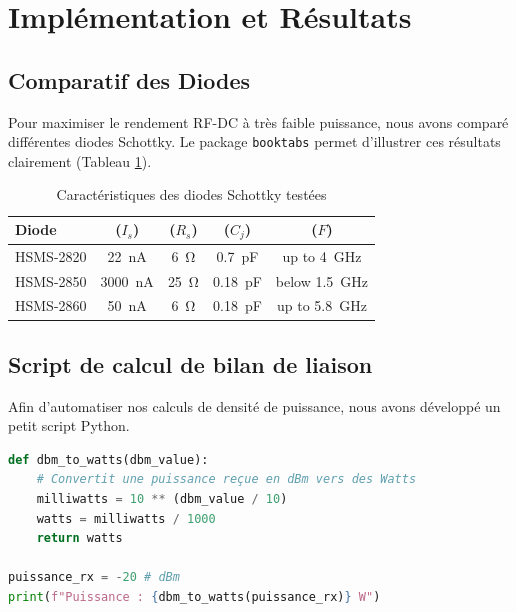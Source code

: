 \section{Implémentation et Résultats}
\label{sec:}

\subsection{Comparatif des Diodes}
Pour maximiser le rendement RF-DC à très faible puissance, nous avons comparé différentes diodes Schottky. Le package \texttt{booktabs} permet d'illustrer ces résultats clairement (Tableau \ref{tab:diodes}).

\begin{table}[h]
    \centering
    \caption{Caractéristiques des diodes Schottky testées}
    \label{tab:diodes}
    \begin{tabular}{lcccc}
        \toprule
        \textbf{Diode} & \textbf{($I_s$)} & \textbf{($R_s$)} & \textbf{($C_j$)} & \textbf{($F$)}\\
        \midrule
        HSMS-2820 & \SI{22}{\nano\ampere} & \SI{6}{\ohm} & \SI{0.7}{\pico\farad} & up to \SI{4}{\giga\hertz} \\
         HSMS-2850 & \SI{3000}{\nano\ampere} & \SI{25}{\ohm} & \SI{0.18}{\pico\farad} & below \SI{1.5}{\giga\hertz} \\
        HSMS-2860   & \SI{50}{\nano\ampere} & \SI{6}{\ohm} & \SI{0.18}{\pico\farad} & up to \SI{5.8}{\giga\hertz} \\
        \bottomrule
    \end{tabular}
\end{table}

\subsection{Script de calcul de bilan de liaison}
Afin d'automatiser nos calculs de densité de puissance, nous avons développé un petit script Python.

\begin{lstlisting}[language=Python, caption=Conversion dBm en Watts]
def dbm_to_watts(dbm_value):
    # Convertit une puissance reçue en dBm vers des Watts
    milliwatts = 10 ** (dbm_value / 10)
    watts = milliwatts / 1000
    return watts

puissance_rx = -20 # dBm
print(f"Puissance : {dbm_to_watts(puissance_rx)} W")
\end{lstlisting}